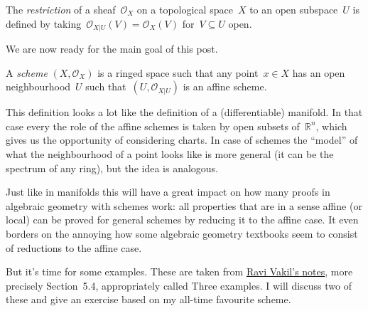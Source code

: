 \begin{definition}
  The \emph{restriction} of a sheaf~$\mathcal{O}_X$ on a topological space~$X$ to an open subspace~$U$ is defined by taking~$\mathcal{O}_{X|U}(V)=\mathcal{O}_X(V)$ for~$V\subseteq U$ open.
\end{definition}

We are now ready for the main goal of this post.

\begin{definition}
  A \emph{scheme} $(X,\mathcal{O}_X)$ is a ringed space such that any point~$x\in X$ has an open neighbourhood~$U$ such that~$(U,\mathcal{O}_{X|U})$ is an affine scheme.
\end{definition}
This definition looks a lot like the definition of a (differentiable) manifold. In that case every the role of the affine schemes is taken by open subsets of~$\mathbb{R}^n$, which gives us the opportunity of considering charts. In case of schemes the ``model'' of what the neighbourhood of a point looks like is more general (it can be the spectrum of any ring), but the idea is analogous.

Just like in manifolds this will have a great impact on how many proofs in algebraic geometry with schemes work: all properties that are in a sense affine (or local) can be proved for general schemes by reducing it to the affine case. It even borders on the annoying how some algebraic geometry textbooks seem to consist of reductions to the affine case.

But it's time for some examples. These are taken from \iftex\cite{foag}\fi\ifblog\href{http://math216.wordpress.com}{Ravi Vakil's notes}\fi, more precisely Section~5.4, appropriately called Three examples. I will discuss two of these and give an exercise based on my all-time favourite scheme.

